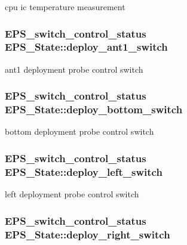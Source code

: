cpu ic temperature measurement \hypertarget{struct_e_p_s___state_a4907eec642bf2671de8e9a47b7d21a6e}{
\subsubsection[{deploy\-\_\-ant1\-\_\-switch}]{\setlength{\rightskip}{0pt plus 5cm}E\-P\-S\-\_\-switch\-\_\-control\-\_\-status E\-P\-S\-\_\-\-State\-::deploy\-\_\-ant1\-\_\-switch}}\label{struct_e_p_s___state_a4907eec642bf2671de8e9a47b7d21a6e}
ant1 deployment probe control switch \hypertarget{struct_e_p_s___state_a976cd905087c155dc203cc811d4d6e42}{
\subsubsection[{deploy\-\_\-bottom\-\_\-switch}]{\setlength{\rightskip}{0pt plus 5cm}E\-P\-S\-\_\-switch\-\_\-control\-\_\-status E\-P\-S\-\_\-\-State\-::deploy\-\_\-bottom\-\_\-switch}}\label{struct_e_p_s___state_a976cd905087c155dc203cc811d4d6e42}
bottom deployment probe control switch \hypertarget{struct_e_p_s___state_a43efa80b7361c5d489ad7227619dafc4}{
\subsubsection[{deploy\-\_\-left\-\_\-switch}]{\setlength{\rightskip}{0pt plus 5cm}E\-P\-S\-\_\-switch\-\_\-control\-\_\-status E\-P\-S\-\_\-\-State\-::deploy\-\_\-left\-\_\-switch}}\label{struct_e_p_s___state_a43efa80b7361c5d489ad7227619dafc4}
left deployment probe control switch \hypertarget{struct_e_p_s___state_a23b8cbc92a799459f7f4577d36f75df5}{
\subsubsection[{deploy\-\_\-right\-\_\-switch}]{\setlength{\rightskip}{0pt plus 5cm}E\-P\-S\-\_\-switch\-\_\-control\-\_\-status E\-P\-S\-\_\-\-State\-::deploy\-\_\-right\-\_\-switch}}\label{struct_e_p_s___state_a23b8cbc92a799459f7f4577d36f75df5}
